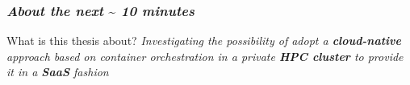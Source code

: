 \begin{frame}
  \frametitle{ \textit{About the next }\sim \textit{ 10 minutes}}
  \begin{block}{ What is this thesis about?}
    \textit{
      Investigating the possibility of adopt a \alert{\textbf{cloud-native}} approach based on
      container orchestration in a private \alert{\textbf{HPC cluster}} to provide it in a \textbf{SaaS}
      fashion
%
    }
  \end{block}
\end{frame}

